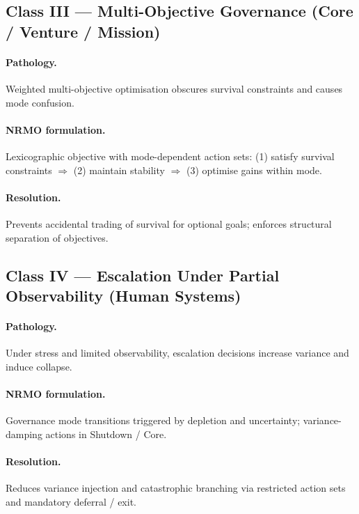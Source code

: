 \subsection{Class III --- Multi-Objective Governance
(Core / Venture / Mission)}
\label{sec:foundations-7-3-class-III}

\paragraph{Pathology.}
Weighted multi-objective optimisation obscures survival constraints
and causes mode confusion.

\paragraph{NRMO formulation.}
Lexicographic objective with mode-dependent action sets:
(1) satisfy survival constraints $\Rightarrow$ (2) maintain
stability $\Rightarrow$ (3) optimise gains within mode.

\paragraph{Resolution.}
Prevents accidental trading of survival for optional goals; enforces
structural separation of objectives.

\subsection{Class IV --- Escalation Under Partial Observability
(Human Systems)}
\label{sec:foundations-7-4-class-IV}

\paragraph{Pathology.}
Under stress and limited observability, escalation decisions
increase variance and induce collapse.

\paragraph{NRMO formulation.}
Governance mode transitions triggered by depletion and uncertainty;
variance-damping actions in Shutdown / Core.

\paragraph{Resolution.}
Reduces variance injection and catastrophic branching via
restricted action sets and mandatory deferral / exit.


